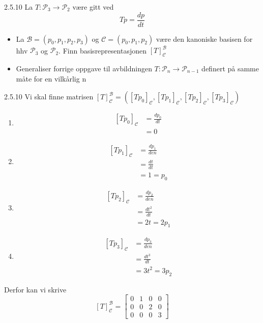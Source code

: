 \documentclass[a4paper,norsk]{article}
\begin{document}
\begin{oppgavebox}{2.5.10}{}
La $ T: \mathcal{P_3} \rightarrow \mathcal{P}_2 $ være gitt ved
\[
    Tp = \frac{ dp }{ dt }
\]
\begin{itemize}
  \item La $ \mathcal{B} = \left( p_0, p_1, p_2, p_3 \right)  $ og $ \mathcal{C} = \left( p_0, p_1, p_2 \right)  $ være den kanoniske basisen for hhv $ \mathcal{P}_3 $ og $ \mathcal{P}_2 $. Finn basisrepresentasjonen $ \left[ T \right] _ {\mathcal{C}}^ {\mathcal{B}} $
  \item Generaliser forrige oppgave til avbildningen $ T : \mathcal{P}_n \rightarrow \mathcal{P}_ {n-1} $ definert på samme måte for en vilkårlig n 
  

\end{itemize}

\begin{proofbox}{2.5.10}{}
Vi skal finne matrisen $ \left[ T \right] _{\mathcal{C}}^{\mathcal{B}} = \left( \left[ Tp_0 \right] _{\mathcal{C}}, \left[ Tp_1 \right] _{\mathcal{C}}, \left[ Tp_2 \right]_{\mathcal{C}}, \left[ Tp_3 \right] _{\mathcal{C}} \right)  $ 

\begin{enumerate}
  \item \begin{align*}
    \left[ Tp_0 \right] _{\mathcal{C}} &= \frac{ dp_0 }{ dt } \\
    &= 0
  \end{align*}
    \item \begin{align*}
      \left[ Tp_1 \right] _{\mathcal{C}} &= \frac{ dp_1 }{ den }\\
      &= \frac{ d t }{ dt }\\
      &= 1 = p_0
    \end{align*}
    \item \begin{align*}
      \left[ Tp_2 \right] _{\mathcal{C}} &= \frac{ dp_2 }{ den } \\
      &= \frac{ d t^2 }{ dt } \\
      &= 2t = 2 p_1
    \end{align*}
    \item \begin{align*}
      \left[ Tp_3 \right] _{\mathcal{C}} &= \frac{ dp_3  }{ den }\\
      &= \frac{ d t^3 }{ dt }\\
      &= 3t^2 = 3p_2
    \end{align*}    
\end{enumerate}
Derfor kan vi skrive 
\[
    \left[ T \right] _{\mathcal{C}}^{\mathcal{B}} = \begin{bmatrix}
        0&1&0&0\\
        0&0&2&0\\
        0&0&0&3
    \end{bmatrix} 
\]
\end{proofbox}
\end{oppgavebox}
\end{document}
